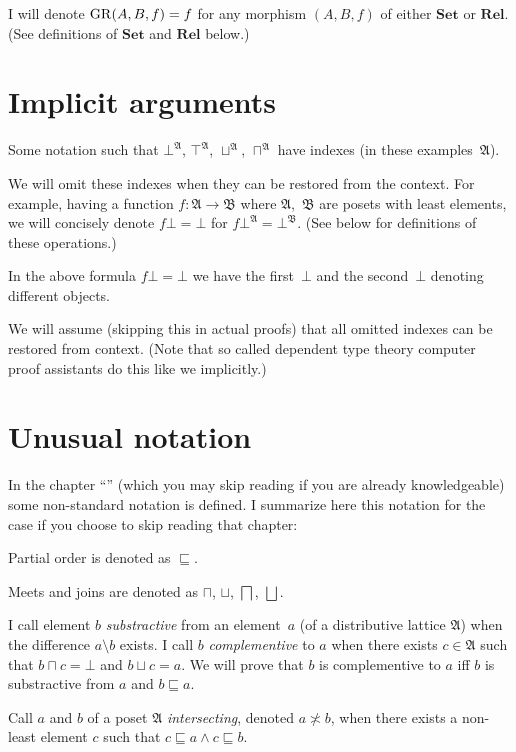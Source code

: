 I will denote $\operatorname{GR}(A,B,f)=f$ for any morphism $(A,B,f)$ of either
$\mathbf{Set}$ or $\mathbf{Rel}$. (See definitions of $\mathbf{Set}$
and $\mathbf{Rel}$ below.)

\section{Implicit arguments}

Some notation such that $\bot^{\mathfrak{A}}$, $\top^{\mathfrak{A}}$,
$\sqcup^{\mathfrak{A}}$, $\sqcap^{\mathfrak{A}}$ have indexes (in these examples~$\mathfrak{A}$).

We will omit these indexes when they can be restored from the context. For example,
having a function $f:\mathfrak{A}\rightarrow\mathfrak{B}$ where $\mathfrak{A}$,~$\mathfrak{B}$
are posets with least elements, we will concisely denote $f\bot = \bot$ for $f\bot^{\mathfrak{A}} = \bot^{\mathfrak{B}}$.
(See below for definitions of these operations.)

\begin{note}
In the above formula $f\bot = \bot$ we have the first~$\bot$ and the second~$\bot$ denoting different objects.
\end{note}

We will assume (skipping this in actual proofs) that all omitted indexes can be restored from context.
(Note that so called dependent type theory computer proof assistants do this like we implicitly.)
\section{Unusual notation}

In the chapter ``'' (which you may skip reading
if you are already knowledgeable) some non-standard notation is defined.
I summarize here this notation for the case if you choose to skip
reading that chapter:

Partial order is denoted as $\sqsubseteq$.

Meets and joins are denoted as $\sqcap$, $\sqcup$, $\bigsqcap$,
$\bigsqcup$.

I call element $b$ \emph{substractive} from an element~$a$ (of a distributive
lattice $\mathfrak{A}$) when the difference $a\setminus b$ exists.
I call $b$ \emph{complementive} to $a$ when there exists $c\in\mathfrak{A}$
such that $b\sqcap c=\bot$ and $b\sqcup c=a$. We will prove that
$b$ is complementive to $a$ iff $b$ is substractive from $a$ and
$b\sqsubseteq a$.
\begin{defn}
Call $a$ and $b$ of a poset $\mathfrak{A}$ \emph{intersecting},
denoted $a\nasymp b$, when there exists a non-least element $c$
such that $c\sqsubseteq a\land c\sqsubseteq b$.
\end{defn}

